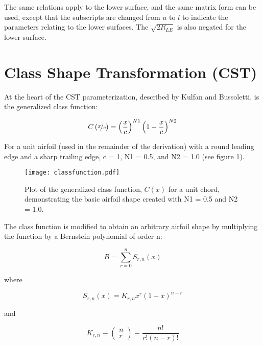 The same relations apply to the lower surface, and the same matrix form can be used, except that the subscripts are changed from $u$ to $l$ to indicate the parameters relating to the lower surfaces. The $\sqrt{2 R_{LE}}$ is also negated for the lower surface.

\section{Class Shape Transformation (CST)}

At the heart of the CST parameterization, described by Kulfan and Bussoletti. \cite{Kulfan2006} is the generalized class function:

\begin{equation}
C\left(\nicefrac{x}{c}\right) = \left( \frac{x}{c} \right)^{N1} \left( 1-\frac{x}{c} \right)^{N2} 
\end{equation}

For a unit airfoil (used in the remainder of the derivation) with a round leading edge and a sharp trailing edge, c = 1, N1 = 0.5, and N2 = 1.0 (see figure \ref{fig:classfunction}).

\begin{figure}[h!]
	\begin{center}
		\texttt{[image: classfunction.pdf]}
	\end{center}
	\caption{Plot of the generalized class function, $C(x)$ for a unit chord, demonstrating the basic airfoil shape created with N1 = 0.5 and N2 = 1.0.}
	\label{fig:classfunction}
\end{figure}

The class function is modified to obtain an arbitrary airfoil shape by multiplying the function by a Bernstein polynomial of order n:

\begin{equation}
B = \sum_{r=0}^n S_{r,n}(x)
\end{equation}

where

\begin{equation}
S_{r,n}(x) = K_{r,n} x^r (1-x)^{n-r}
\end{equation}

and 

\begin{equation}
K_{r,n} \equiv \left( \begin{matrix} n\\r	\end{matrix} \right) \equiv \frac{n!}{r!(n-r)!}
\end{equation}

